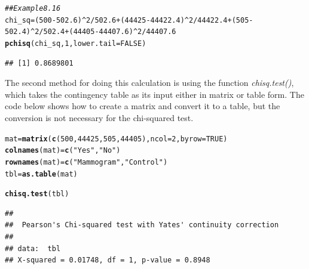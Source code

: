 \documentclass{report}\usepackage[]{graphicx}\usepackage[]{color}
\makeatletter
\newcommand{\hlnum}[1]{\textcolor[rgb]{0.686,0.059,0.569}{#1}}%
\newcommand{\hlstr}[1]{\textcolor[rgb]{0.192,0.494,0.8}{#1}}%
\newcommand{\hlcom}[1]{\textcolor[rgb]{0.678,0.584,0.686}{\textit{#1}}}%
\newcommand{\hlopt}[1]{\textcolor[rgb]{0,0,0}{#1}}%
\newcommand{\hlstd}[1]{\textcolor[rgb]{0.345,0.345,0.345}{#1}}%
\newcommand{\hlkwb}[1]{\textcolor[rgb]{0.69,0.353,0.396}{#1}}%
\newcommand{\hlkwc}[1]{\textcolor[rgb]{0.333,0.667,0.333}{#1}}%
\newcommand{\hlkwd}[1]{\textcolor[rgb]{0.737,0.353,0.396}{\textbf{#1}}}%
\newenvironment{kframe}{%
 \def\at@end@of@kframe{}%
 \ifinner\ifhmode%
  \def\at@end@of@kframe{\end{minipage}}%
  \begin{minipage}{\columnwidth}%
 \fi\fi%
 \def\FrameCommand##1{\hskip\@totalleftmargin \hskip-\fboxsep
 \colorbox{shadecolor}{##1}\hskip-\fboxsep
     \hskip-\linewidth \hskip-\@totalleftmargin \hskip\columnwidth}%
 \MakeFramed {\advance\hsize-\width
   \@totalleftmargin\z@ \linewidth\hsize
   \@setminipage}}%
 {\par\unskip\endMakeFramed%
 \at@end@of@kframe}
\newenvironment{knitrout}{}{} %
\makeatother
\begin{document}
\begin{knitrout}
\color{fgcolor}\begin{kframe}
\begin{alltt}
\hlcom{## Example 8.16 }
\hlstd{chi_sq} \hlkwb{=} \hlstd{(}\hlnum{500}\hlopt{-}\hlnum{502.6}\hlstd{)}\hlopt{^}\hlnum{2}\hlopt{/}\hlnum{502.6} \hlopt{+} \hlstd{(}\hlnum{44425}\hlopt{-}\hlnum{44422.4}\hlstd{)}\hlopt{^}\hlnum{2}\hlopt{/}\hlnum{44422.4} \hlopt{+} \hlstd{(}\hlnum{505}\hlopt{-}\hlnum{502.4}\hlstd{)}\hlopt{^}\hlnum{2}\hlopt{/}\hlnum{502.4}  \hlopt{+} \hlstd{(}\hlnum{44405}\hlopt{-}\hlnum{44407.6}\hlstd{)}\hlopt{^}\hlnum{2}\hlopt{/}\hlnum{44407.6}
\hlkwd{pchisq}\hlstd{(chi_sq,} \hlnum{1}\hlstd{,} \hlkwc{lower.tail} \hlstd{=} \hlnum{FALSE}\hlstd{)}
\end{alltt}
\begin{verbatim}
## [1] 0.8689801
\end{verbatim}
\end{kframe}
\end{knitrout}

The second method for doing this calculation is using the function \textit{chisq.test()}, which takes the contingency table as its input either in matrix or table form.  The code below shows how to create a matrix and convert it to a table, but the conversion is not necessary for the chi-squared test.  

\begin{knitrout}
\color{fgcolor}\begin{kframe}
\begin{alltt}
\hlstd{mat} \hlkwb{=} \hlkwd{matrix}\hlstd{(}\hlkwd{c}\hlstd{(}\hlnum{500}\hlstd{,}\hlnum{44425}\hlstd{,} \hlnum{505}\hlstd{,}\hlnum{44405}\hlstd{),} \hlkwc{ncol} \hlstd{=} \hlnum{2}\hlstd{,} \hlkwc{byrow} \hlstd{=} \hlnum{TRUE}\hlstd{)}
\hlkwd{colnames}\hlstd{(mat)} \hlkwb{=} \hlkwd{c}\hlstd{(}\hlstr{"Yes"}\hlstd{,} \hlstr{"No"}\hlstd{)}
\hlkwd{rownames}\hlstd{(mat)} \hlkwb{=} \hlkwd{c}\hlstd{(}\hlstr{"Mammogram"}\hlstd{,} \hlstr{"Control"}\hlstd{)}
\hlstd{tbl} \hlkwb{=} \hlkwd{as.table}\hlstd{(mat)}

\hlkwd{chisq.test}\hlstd{(tbl)}
\end{alltt}
\begin{verbatim}
## 
## 	Pearson's Chi-squared test with Yates' continuity correction
## 
## data:  tbl
## X-squared = 0.01748, df = 1, p-value = 0.8948
\end{verbatim}
\end{kframe}
\end{knitrout}
\end{document}
